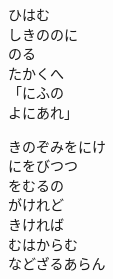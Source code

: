 \documentclass[10pt,b5j]{tarticle} %
\begin{document}
\begin{enumerate}
\begin{minipage}[c]{\blocksize}
        \vspace{\linespace}
        \item
        ひはむ\\
        しきののに\\
        のる\\
        たかくへ\\
        「にふの\\
        よにあれ」
        
        \vspace{\linespace}
        \item
        きのぞみをにけ\\
        にをびつつ\\
        をむるの\\
        がけれど\\
        きければ\\
        むはからむ\\
        などざるあらん
    
    \end{minipage}
\end{enumerate} %
\end{document}
